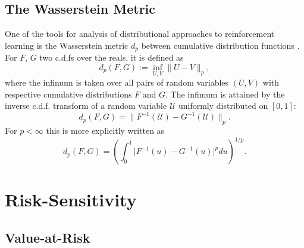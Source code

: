 \subsection{The Wasserstein Metric}
\newcommand{\pnorm}[1]{\| #1 \|_p}

One of the tools for analysis of distributional approaches to reinforcement learning is the Wasserstein metric $d_p$ between cumulative distribution functions \citep[see e.g.][where it is called the Mallows metric]{bickel81asymptotic}. For $F$, $G$ two c.d.fs over the reals, it is defined as
\begin{equation*}
d_p(F, G) := \inf_{U, V} \pnorm{U - V},
\end{equation*}
where the infimum is taken over all pairs of random variables $(U, V)$ with respective cumulative distributions $F$ and $G$. The infimum is attained by the inverse c.d.f. transform of a random variable $\mathcal{U}$ uniformly distributed on $[0, 1]$:
\begin{equation*}
d_p(F, G) = \| F^{-1}(\mathcal{U}) - G^{-1}(\mathcal{U}) \|_p .
\end{equation*}
For $p < \infty$ this is more explicitly written as
\begin{equation}
d_p(F, G) = \left ( \int_0^1 \big | F^{-1}(u) - G^{-1}(u) \big |^p du \right )^{1/p} .
\end{equation}




\section{Risk-Sensitivity}\label{sec:prelim:risk}




\subsection{Value-at-Risk}

